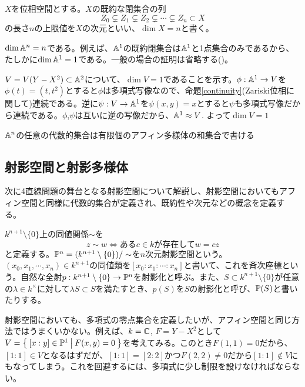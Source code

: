 \documentclass{ltjsreport}
\begin{document}
\begin{defin}
  $X$を位相空間とする。$X$の既約な閉集合の列
  \[
  Z_0\subsetneq Z_1\subsetneq Z_2\subsetneq\cdots\subsetneq Z_n\subset X   
  \]
  の長さ$n$の上限値を$X$の次元といい、$\dim X=n$と書く。
\end{defin}

\begin{eg}
  $\dim\mathbb{A}^n=n$である。例えば、$\mathbb{A}^1$の既約閉集合は$\mathbb{A}^1$と1点集合のみであるから、たしかに$\dim\mathbb{A}^1=1$である。一般の場合の証明は省略する(\cite{RH})。
\end{eg}

\begin{eg}
  $V=V(Y-X^2)\subset\mathbb{A}^2$について、$\dim V=1$であることを示す。$\phi:\mathbb{A}^1\rightarrow V$を$\phi(t)=(t,t^2)$とすると$\phi$は多項式写像なので、命題\ref{continuity}(Zariski位相に関して)連続である。逆に$\psi:V\rightarrow \mathbb{A}^1$を$\psi(x,y)=x$とすると$\psi$も多項式写像だから連続である。$\phi$,$\psi$は互いに逆の写像だから、$\mathbb{A}^1\approx V$. よって$\dim V=1$
\end{eg}

\begin{fact}[\cite{RH}]\label{noether_space}
  $\mathbb{A}^n$の任意の代数的集合は有限個のアフィン多様体の和集合で書ける
\end{fact}


\subsection{射影空間と射影多様体}

次に4直線問題の舞台となる射影空間について解説し、射影空間においてもアフィン空間と同様に代数的集合が定義され、既約性や次元などの概念を定義する。

\begin{defin}
  $k^{n+1}\setminus\{0\}$上の同値関係$\sim$を
  \[
  z\sim w\Leftrightarrow \text{ある$c\in k$が存在して}w=cz  
  \]
  と定義する。$\mathbb{P}^n=(k^{n+1}\setminus\{0\})/\sim$を$n$次元射影空間という。$(x_0,x_1,\cdots,x_n)\in k^{n+1}$の同値類を$[x_0:x_1:\cdots:x_n]$と書いて、これを斉次座標という。自然な全射$p:k^{n+1}\setminus\{0\}\rightarrow \mathbb{P}^n$を射影化と呼ぶ。また、$S\subset k^{n+1}\setminus\{0\}$が任意の$\lambda\in k^\times $に対して$\lambda S\subset S$を満たすとき、$p(S)$を$S$の射影化と呼び、$\mathbb{P}(S)$と書いたりする。
\end{defin}

射影空間においても、多項式の零点集合を定義したいが、アフィン空間と同じ方法ではうまくいかない。例えば、$k=\mathbb{C}$, $F=Y-X^2$として$V=\left\{\:[x:y]\in\mathbb{P}^1\:\middle|\:F(x,y)=0\:\right\}$を考えてみる。このとき$F(1,1)=0$だから、$[1:1]\in V$となるはずだが、$[1:1]=[2:2]$かつ$F(2,2)\neq 0$だから$[1:1]\notin V$にもなってしまう。これを回避するには、多項式に少し制限を設けなければならない。
\end{document}
